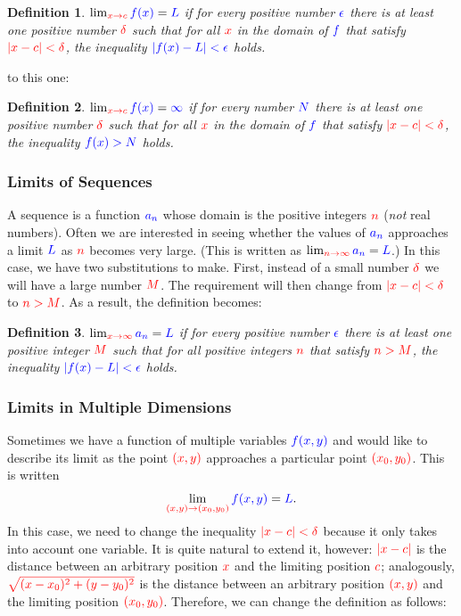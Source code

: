 \documentclass{myarticle}
\newcommand{\hor}[1]{\textcolor{red}{#1}}
\newcommand{\ver}[1]{\textcolor{blue}{#1}}
\theoremstyle{nospace}
\newtheorem*{oldattempt}{Definition}
\newenvironment{attempt}
{\begin{mdframed}\begin{oldattempt}}
    {\end{oldattempt}\end{mdframed}}
\newtheorem{old series theorem}{Theorem}
\newenvironment{series theorem}
{\begin{mdframed}\begin{old series theorem}}
    {\end{old series theorem}\end{mdframed}}
\begin{document}
\begin{attempt}
  $\lim_{\hor{x \to c}} \ver{f(x)} = \ver{L}$ if for every positive
  number $\ver{\epsilon}$ there is at least one positive number
  $\hor{\delta}$ such that for all $\hor{x}$ in the domain of
  $\ver{f}$ that satisfy $\hor{|x - c| < \delta}$, the inequality
  $\ver{|f(x) - L| < \epsilon}$ holds.
\end{attempt}

to this one:

\begin{attempt}
  $\lim_{\hor{x \to c}} \ver{f(x)} = \ver{\infty}$ if for every number
  $\ver{N}$ there is at least one positive number $\hor{\delta}$ such
  that for all $\hor{x}$ in the domain of $\ver{f}$ that satisfy
  $\hor{|x - c| < \delta}$, the inequality $\ver{f(x) > N}$ holds.
\end{attempt}

\subsubsection{Limits of Sequences}
\label{sec:limits of sequences}

A sequence is a function $\ver{a_n}$ whose domain is the positive
integers $\hor{n}$ (\emph{not} real numbers). Often we are interested
in seeing whether the values of $\ver{a_n}$ approaches a limit
$\ver{L}$ as $\hor{n}$ becomes very large. (This is written as
$\lim_{\hor{n \to \infty}} \ver{a_n} = \ver{L}$.) In this case, we
have two substitutions to make. First, instead of a small number
$\hor{\delta}$ we will have a large number $\hor{M}$. The requirement
will then change from $\hor{|x - c| < \delta}$ to $\hor{n > M}$. As a
result, the definition becomes:

\begin{attempt}
  $\lim_{\hor{x \to \infty}} \ver{a_n} = \ver{L}$ if for every
  positive number $\ver{\epsilon}$ there is at least one positive
  integer $\hor{M}$ such that for all positive integers $\hor{n}$ that
  satisfy $\hor{n > M}$, the inequality $\ver{|f(x) - L| < \epsilon}$
  holds.
\end{attempt}

\subsubsection{Limits in Multiple Dimensions}
\label{sec:limits in multiple dimensions}

Sometimes we have a function of multiple variables $\ver{f(x, y)}$ and
would like to describe its limit as the point $\hor{(x, y)}$
approaches a particular point $\hor{(x_0, y_0)}$. This is written
\[
  \lim_{\hor{(x, y) \to (x_0, y_0)}} \ver{f(x, y)} = \ver{L}.
\]
In this case, we need to change the inequality
$\hor{|x - c| < \delta}$ because it only takes into account one
variable. It is quite natural to extend it, however: $\hor{|x - c|}$
is the distance between an arbitrary position $\hor{x}$ and the
limiting position $\hor{c}$; analogously,
$\hor{\sqrt{(x - x_0)^2 + (y - y_0)^2}}$ is the distance between an
arbitrary position $\hor{(x, y)}$ and the limiting position
$\hor{(x_0, y_0)}$. Therefore, we can change the definition as
follows:
\end{document}
